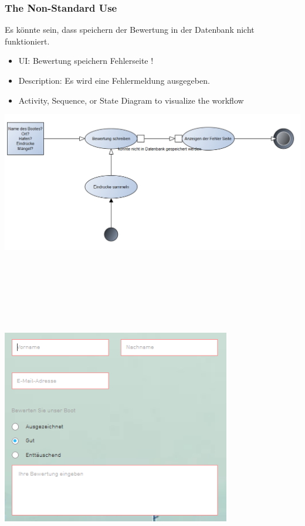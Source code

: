 \documentclass[12pt]{article}
\theoremstyle{definition}
\begin{document}
\subsubsection{The Non-Standard Use}
Es könnte sein, dass speichern der Bewertung in der Datenbank nicht funktioniert.
\begin{itemize}
	\item UI: Bewertung speichern Fehlerseite !
	\item Description: Es wird eine Fehlermeldung ausgegeben.
	\item Activity, Sequence, or State Diagram to visualize the workflow
\end{itemize}
\includegraphics[height=0.40\textwidth]{Bewertung_schreiben_Fehler.PNG}
\begin{center}\includegraphics[width=10cm,height=15cm,keepaspectratio]{Bewertung_Pflichtfelder.PNG}\end{center}
\pagebreak
\end{document}
